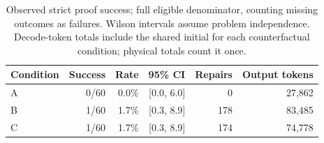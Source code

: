 \begin{table}[t]
\centering
\caption{Observed strict proof success; full eligible denominator, counting missing outcomes as failures. Wilson intervals assume problem independence. Decode-token totals include the shared initial for each counterfactual condition; physical totals count it once.}
\label{tab:abc}
\small
\begin{tabular}{lrrrrr}
\toprule
Condition & Success & Rate & 95\% CI & Repairs & Output tokens \\
\midrule
A & 0/60 & 0.0\% & [0.0, 6.0] & 0 & 27,862 \\
B & 1/60 & 1.7\% & [0.3, 8.9] & 178 & 83,485 \\
C & 1/60 & 1.7\% & [0.3, 8.9] & 174 & 74,778 \\
\bottomrule
\end{tabular}
\end{table}

